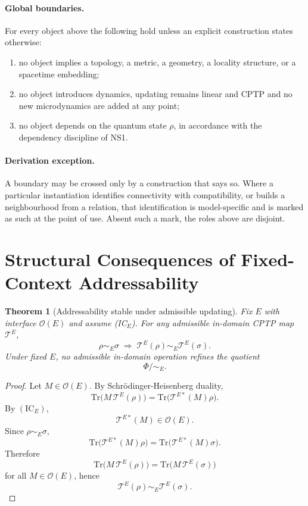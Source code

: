 \documentclass[aps,prx,onecolumn,11pt]{revtex4-2}
\theoremstyle{plain}
\newtheorem{theorem}{Theorem}
\theoremstyle{definition}
\theoremstyle{remark}
\begin{document}
\paragraph{Global boundaries.}
For every object above the following hold unless an explicit
construction states otherwise:
\begin{enumerate}[label=(\alph*), leftmargin=2.4em]
\item no object implies a topology, a metric, a geometry, a locality
structure, or a spacetime embedding;
\item no object introduces dynamics, updating remains linear and CPTP
and no new microdynamics are added at any point;
\item no object depends on the quantum state \(\rho\), in accordance
with the dependency discipline of NS1.
\end{enumerate}

\paragraph{Derivation exception.}
A boundary may be crossed only by a construction that says so. Where a
particular instantiation identifies connectivity with compatibility, or
builds a neighbourhood from a relation, that identification is
model-specific and is marked as such at the point of use. Absent such a
mark, the roles above are disjoint.


\section{Structural Consequences of Fixed-Context Addressability}
\label{sec:structural_consequences_addressability}

\begin{theorem}[Addressability stable under admissible updating]
\label{thm:fixed_context_no_retro_addressability}
Fix \(E\) with interface \(\mathcal{O}(E)\) and assume
\emph{(IC\(_E\))}. For any admissible in-domain CPTP map
\(\mathcal{T}^E\),
\[
\rho \sim_E \sigma
\;\Longrightarrow\;
\mathcal{T}^E(\rho) \sim_E \mathcal{T}^E(\sigma).
\]
Under fixed \(E\), no admissible in-domain operation refines the
quotient
\[
\Phi/{\sim_E}.
\]
\end{theorem}

\begin{proof}
Let \(M\in\mathcal{O}(E)\). By Schrödinger-Heisenberg duality,
\[
\mathrm{Tr}\bigl(M\,\mathcal{T}^E(\rho)\bigr)
=
\mathrm{Tr}\bigl(\mathcal{T}^{E*}(M)\rho\bigr).
\]
By \((\mathrm{IC}_E)\),
\[
\mathcal{T}^{E*}(M)\in\mathcal{O}(E).
\]
Since \(\rho\sim_E\sigma\),
\[
\mathrm{Tr}\bigl(\mathcal{T}^{E*}(M)\rho\bigr)
=
\mathrm{Tr}\bigl(\mathcal{T}^{E*}(M)\sigma\bigr).
\]
Therefore
\[
\mathrm{Tr}\bigl(M\,\mathcal{T}^E(\rho)\bigr)
=
\mathrm{Tr}\bigl(M\,\mathcal{T}^E(\sigma)\bigr)
\]
for all \(M\in\mathcal{O}(E)\), hence
\[
\mathcal{T}^E(\rho)\sim_E\mathcal{T}^E(\sigma).
\]
\end{proof}
\end{document}
